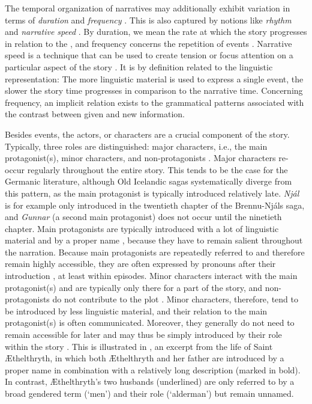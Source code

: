 \documentclass[output=paper,colorlinks,citecolor=brown]{langscibook}
\begin{document}
The temporal organization of narratives may additionally exhibit variation in terms of \textit{duration} and \textit{frequency} \citep{Genette1972, Genette1980}. This is also captured by notions like \textit{rhythm} \citep{Bal1985} and \textit{narrative speed} \citep{Hume2005}. By duration, we mean the rate at which the story progresses in relation to the , and frequency  concerns the repetition of events \citep{Genette1972}. Narrative speed is a technique that can be used to create tension or focus attention on a particular aspect of the story \citep{Hume2005, Kukkonen2020}. It is by definition related to the linguistic representation: The more linguistic material is used to express a single event, the slower the story time progresses in comparison to the narrative time. Concerning frequency, an implicit relation exists to the grammatical patterns associated with the contrast between given and new information.

Besides events, the actors, or characters are a crucial component of the story. Typically, three roles are distinguished: major characters, i.e., the main protagonist(s), minor characters, and non-protagonists \citep{Redeker1987}. Major characters re-occur regularly throughout the entire story. This tends to be the case for the Germanic literature, although Old Icelandic sagas systematically diverge from this pattern, as the main protagonist is typically introduced relatively late. \textit{Njál} is for example only introduced in the twentieth chapter of the Brennu-Njáls saga, and \textit{Gunnar} (a second main protagonist) does not occur until the ninetieth chapter. Main protagonists are typically introduced with a lot of linguistic material and by a proper name \citep{Sanford1988}, because they have to remain salient throughout the narration. Because main protagonists are repeatedly referred to and therefore remain highly accessible, they are often expressed by pronouns after their introduction \citep[93--96]{Ariel2004}, at least within episodes. Minor characters interact with the main protagonist(s) and are typically only there for a part of the story, and non-protagonists do not contribute to the plot \citep{Redeker1987}. Minor characters, therefore, tend to be introduced by less linguistic material, and their relation to the main protagonist(s) is often communicated. Moreover, they generally do not need to remain accessible for later and may thus be simply introduced by their role within the story \citep{Sanford1988, Ariel2004}. This is illustrated in , an excerpt from the life of Saint Æthelthryth, in which both Æthelthryth and her father are introduced by a proper name in combination with a relatively long description (marked in bold). In contrast, Æthelthryth's two husbands (underlined) are only referred to by a broad gendered term (`men') and their role (`alderman') but remain unnamed.
\end{document}
